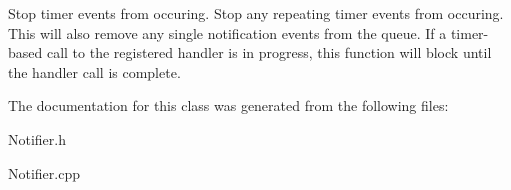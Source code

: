 \-Stop timer events from occuring. \-Stop any repeating timer events from occuring. \-This will also remove any single notification events from the queue. \-If a timer-\/based call to the registered handler is in progress, this function will block until the handler call is complete. 

\-The documentation for this class was generated from the following files\-:\begin{DoxyCompactItemize}
\item 
\-Notifier.\-h\item 
\-Notifier.\-cpp\end{DoxyCompactItemize}
